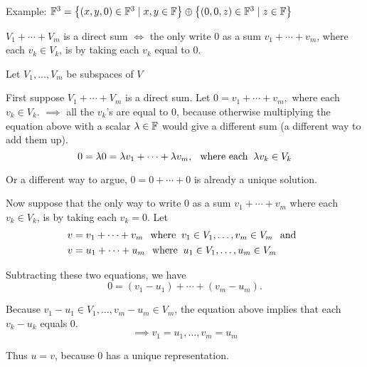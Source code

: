\begin{example}
  Example: $\mathbb{F}^3 =
  \left \{ \left ( x, y, 0 \right ) \in \mathbb{F}^3 \mid x,y \in \mathbb{F} \right \}
  \oplus
  \left \{ \left (  0, 0, z  \right ) \in \mathbb{F}^3 \mid z \in \mathbb{F} \right \}$
\end{example}


\setcounter{thm}{44}
\begin{thm} 
  \label{thm: condition for a direct sum}
  $V_1 + \cdots + V_m$ is a direct sum $\iff$ the only write $0$ as a sum $v_1 + \cdots + v_m$, where each $v_k \in V_k$, is by taking each $v_k$ equal to $0$.
\end{thm}
\begin{prf}
    Let  $V_1, \ldots, V_m$ be subspaces of $V$

     First suppose $V_1 + \cdots + V_m$ is a direct sum. Let $0 = v_1 + \cdots + v_m,$ where each $v_k \in V_k$.
    $\implies$ all the $v_k$'s are equal to $0$, because otherwise multiplying the equation above with a scalar $\lambda \in \mathbb{F}$ would give a different sum (a different way to add them up).
    \begin{equation}
      0 = \lambda0= \lambda v_1 + \cdots + \lambda v_m, \;\;\, \text{where each}\;\; \lambda v_k \in V_k
    \end{equation}

    Or a different way to argue, $0 = 0 + \cdots + 0$ is already a unique solution.

     Now suppose that the only way to write $0$ as a sum $v_1 + \cdots + v_m$ where each $v_k \in V_k$, is by taking each $v_k = 0$. Let
    \begin{equation}
      \begin{aligned}
        v&=v_1 + \cdots + v_m \;\;\, \text{where}\;\; v_1 \in V_1, \ldots, v_m \in V_m \;\;\, \text{and}\;\; \\
        v&=u_1 + \cdots + u_m  \;\;\, \text{where}\;\; u_1 \in V_1, \ldots, u_m \in V_m
      \end{aligned}
    \end{equation}

    Subtracting these two equations, we have
    \begin{equation}
      0=(v_1-u_1)+\cdots+(v_m-u_m).
    \end{equation}

    Because $v_1 - u_1 \in V_1, \ldots, v_m - u_m \in V_m$, the equation above implies that each $v_k -u_k$ equals $0$.
    \begin{equation}
      \implies v_1=u_1, \ldots, v_m=u_m
    \end{equation}

    Thus $u=v$, because $0$ has a unique representation.
\end{prf}

